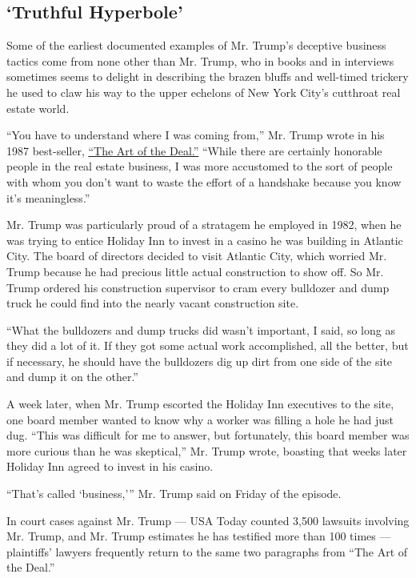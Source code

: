 \hypertarget{truthful-hyperbole}{%
\subsection{`Truthful Hyperbole'}\label{truthful-hyperbole}}

Some of the earliest documented examples of Mr. Trump's deceptive
business tactics come from none other than Mr. Trump, who in books and
in interviews sometimes seems to delight in describing the brazen bluffs
and well-timed trickery he used to claw his way to the upper echelons of
New York City's cutthroat real estate world.

``You have to understand where I was coming from,'' Mr. Trump wrote in
his 1987 best-seller,
\href{http://www.nytimes3xbfgragh.onion/2015/09/22/upshot/10-things-i-learned-about-donald-trump-in-the-art-of-the-deal.html}{``The
Art of the Deal.''} ``While there are certainly honorable people in the
real estate business, I was more accustomed to the sort of people with
whom you don't want to waste the effort of a handshake because you know
it's meaningless.''

Mr. Trump was particularly proud of a stratagem he employed in 1982,
when he was trying to entice Holiday Inn to invest in a casino he was
building in Atlantic City. The board of directors decided to visit
Atlantic City, which worried Mr. Trump because he had precious little
actual construction to show off. So Mr. Trump ordered his construction
supervisor to cram every bulldozer and dump truck he could find into the
nearly vacant construction site.

``What the bulldozers and dump trucks did wasn't important, I said, so
long as they did a lot of it. If they got some actual work accomplished,
all the better, but if necessary, he should have the bulldozers dig up
dirt from one side of the site and dump it on the other.''

A week later, when Mr. Trump escorted the Holiday Inn executives to the
site, one board member wanted to know why a worker was filling a hole he
had just dug. ``This was difficult for me to answer, but fortunately,
this board member was more curious than he was skeptical,'' Mr. Trump
wrote, boasting that weeks later Holiday Inn agreed to invest in his
casino.

``That's called `business,''' Mr. Trump said on Friday of the episode.

In court cases against Mr. Trump --- USA Today counted 3,500 lawsuits
involving Mr. Trump, and Mr. Trump estimates he has testified more than
100 times --- plaintiffs' lawyers frequently return to the same two
paragraphs from ``The Art of the Deal.''


